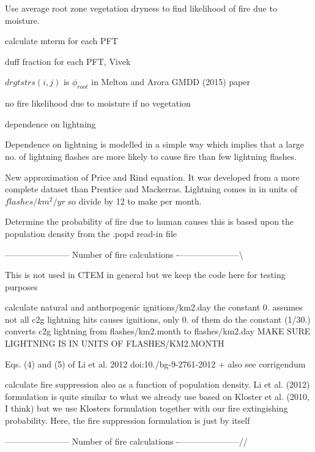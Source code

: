 Use average root zone vegetation dryness to find likelihood of fire due to moisture.

calculate mterm for each P\+F\+T

duff fraction for each P\+F\+T, Vivek

$drgtstrs(i,j)$ is $\phi_{root}$ in Melton and Arora G\+M\+D\+D (2015) paper

no fire likelihood due to moisture if no vegetation


\begin{DoxyEnumerate}
\item dependence on lightning
\end{DoxyEnumerate}

Dependence on lightning is modelled in a simple way which implies that a large no. of lightning flashes are more likely to cause fire than few lightning flashes.

New approximation of Price and Rind equation. It was developed from a more complete dataset than Prentice and Mackerras. Lightning comes in in units of $flashes/km^2/yr$ so divide by 12 to make per month.

Determine the probability of fire due to human causes this is based upon the population density from the .popd read-\/in file

----------------------- Number of fire calculations -\/---------------------\textbackslash{}

This is not used in C\+T\+E\+M in general but we keep the code here for testing purposes

calculate natural and anthorpogenic ignitions/km2.\+day the constant 0. assumes not all c2g lightning hits causes ignitions, only 0. of them do the constant (1/30.) converts c2g lightning from flashes/km2.\+month to flashes/km2.\+day M\+A\+K\+E S\+U\+R\+E L\+I\+G\+H\+T\+N\+I\+N\+G I\+S I\+N U\+N\+I\+T\+S O\+F F\+L\+A\+S\+H\+E\+S/\+K\+M2.\+M\+O\+N\+T\+H

Eqs. (4) and (5) of Li et al. 2012 doi\+:10./bg-\/9-\/2761-\/2012 + also see corrigendum

calculate fire suppression also as a function of population density. Li et al. (2012) formulation is quite similar to what we already use based on Kloster et al. (2010, I think) but we use Kloster\textquotesingle{}s formulation together with our fire extingishing probability. Here, the fire suppression formulation is just by itself

----------------------- Number of fire calculations -\/---------------------//

